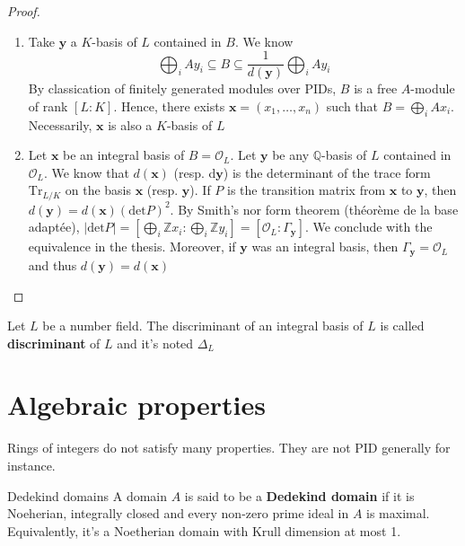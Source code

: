 \begin{proof}{}
\begin{enumerate}[label = \arabic*)]
    \item Take \(\mathbf{y} \) a \(K\)-basis of \(L\) contained in \(B\). We
        know
        \[
          \bigoplus_i A y_{i} \subseteq B \subseteq \frac{1}{d{(\mathbf{y} )}}
          \bigoplus_i A y_{i}
        \]
        By classication of finitely generated modules over PIDs, \(B\) is a free
        \(A\)-module of rank \([L : K]\). Hence, there exists \(\mathbf{x}  =
        {(x_{1}, \dots, x_{n})}\) such that \(B = \bigoplus_i A x_{i}\).
        Necessarily, \(\mathbf{x} \) is also a \(K\)-basis of \(L\) 
    \item Let \(\mathbf{x} \) be an integral basis of \(B = \mathcal{O}_L\). Let
        \(\mathbf{y} \) be any \(\mathbb{Q}\)-basis of \(L\) contained in
        \(\mathcal{O}_L\). We know that \(d{(\mathbf{x})}\) (resp. d\(\mathbf{y}
        \)) is the determinant of the trace form \(\mathrm{Tr}_{L / K} \) on the
        basis \(\mathbf{x} \) (resp. \(\mathbf{y} \)). If \(P\) is the
        transition matrix from \(\mathbf{x} \) to \(\mathbf{y} \), then
        \(d{(\mathbf{y} )} = d{(\mathbf{x} )} {\left( \mathrm{det} P \right)}^2
        \). By Smith's nor form theorem (théorème de la base adaptée),
        \(|\mathrm{det}P| = [ \bigoplus_{i} \mathbb{Z} x_{i} : \bigoplus_{i}
        \mathbb{Z}y_{i} ] = [\mathcal{O}_L : \Gamma_\mathbf{y} ]\). We conclude
        with the equivalence in the thesis. Moreover, if \(\mathbf{y} \) was an
        integral basis, then \(\Gamma_\mathbf{y} = \mathcal{O}_L\) and thus
        \(d{(\mathbf{y} )} = d{(\mathbf{x} )}\) 
\end{enumerate}

\end{proof}

\begin{definition}{}
    Let \(L\) be a number field. The discriminant of an integral basis of \(L\)
    is called \textbf{discriminant} of \(L\) and it's noted \(\Delta_L\) 
\end{definition}

\section{Algebraic properties}

Rings of integers do not satisfy many properties. They are not PID generally for
instance.
\begin{definition}{Dedekind domains}
    A domain \(A\) is said to be a \textbf{Dedekind domain} if it is Noeherian,
    integrally closed and every non-zero prime ideal in \(A\) is maximal.
    Equivalently, it's a Noetherian domain with Krull dimension at most 1.
\end{definition}

